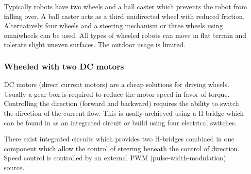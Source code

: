 \documentclass[11pt,a4paper]{article}
\begin{document}
Typically robots have two wheels and a ball caster which prevents the robot from falling over. A ball caster acts as a third unidirected wheel with reduced friction. Alternatively four wheels and a steering mechanism or three wheels using omniwheels can be used. All types of wheeled robots can move in flat terrain and tolerate slight uneven surfaces. The outdoor usage is limited.
\subsubsection{Wheeled with two DC motors}
DC motors (direct current motors) are a cheap solutions for driving wheels. Usually a gear box is required to reduce the motor speed in favor of torque. Controlling the direction (forward and backward) requires the ability to switch the direction of the current flow. This is usally archieved using a H-bridge which can be found in as an integrated circuit or build using four electrical switches. 

There exist integrated circuits which provides two H-bridges combined in one component which allow the control of steering beneath the control of direction. Speed control is controlled by an external PWM (pulse-width-modulation) source.
\end{document}

